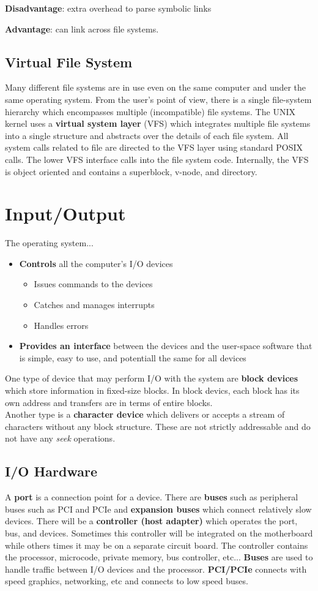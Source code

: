 \documentclass{article}
\newcommand{\bold}[1]{\textbf{#1}}
\renewcommand{\b}{\item[$\circ$]}
\newcommand{\newlist}{\begin{itemize}}
\renewcommand{\endlist}{\end{itemize}}
\begin{document}
\bold{Disadvantage}: extra overhead to parse symbolic links

\bold{Advantage}: can link across file systems. 

\subsection{Virtual File System}

Many different file systems are in use even on the same computer and under the same operating system. From the user's point of view, there is a single file-system hierarchy which encompasses multiple (incompatible) file systems. The UNIX kernel uses a \bold{virtual system layer} (VFS) which integrates multiple file systems into a single structure and abstracts over the details of each file system. All system calls related to file are directed to the VFS layer using standard POSIX calls. The lower VFS interface calls into the file system code. Internally, the VFS is object oriented and contains a superblock, v-node, and directory. 

\newpage
\section{Input/Output}

The operating system...

\newlist 
\b \bold{Controls} all the computer's I/O devices
\newlist 
\b Issues commands to the devices
\b Catches and manages interrupts
\b Handles errors
\endlist 
\b \bold{Provides an interface} between the devices and the user-space software that is simple, easy to use, and potentiall the same for all devices
\endlist 

One type of device that may perform I/O with the system are \bold{block devices} which store information in fixed-size blocks. In block devics, each block has its own address and transfers are in terms of entire blocks. \\

Another type is a \bold{character device} which delivers or accepts a stream of characters without any block structure. These are not strictly addressable and do not have any \emph{seek} operations. 

\subsection{I/O Hardware}

A \bold{port} is a connection point for a device. There are \bold{buses} such as {peripheral buses} such as PCI and PCIe and \bold{expansion buses} which connect relatively slow devices. There will be a \bold{controller (host adapter)} which operates the port, bus, and devices. Sometimes this controller will be integrated on the motherboard while others times it may be on a separate circuit board. The controller contains the processor, microcode, private memory, bus controller, etc... \bold{Buses} are used to handle traffic between I/O devices and the processor. \bold{PCI/PCIe} connects with speed graphics, networking, etc and connects to low speed buses. \\ 
\end{document}

